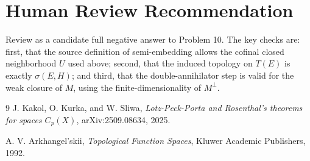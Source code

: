 \documentclass[11pt]{amsart}
\begin{document}
\section*{Human Review Recommendation}

Review as a candidate full negative answer to Problem 10.  The key checks are:
first, that the source definition of semi-embedding allows the cofinal closed
neighborhood \(U\) used above; second, that the induced topology on \(T(E)\)
is exactly \(\sigma(E,H)\); and third, that the double-annihilator step is
valid for the weak closure of \(M\), using the finite-dimensionality of
\(M^\perp\).

\begin{thebibliography}{9}
J. Kakol, O. Kurka, and W. Sliwa,
\emph{Lotz-Peck-Porta and Rosenthal's theorems for spaces \(C_p(X)\)},
arXiv:2509.08634, 2025.

A. V. Arkhangel'skii,
\emph{Topological Function Spaces},
Kluwer Academic Publishers, 1992.
\end{thebibliography}
\end{document}
